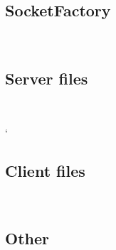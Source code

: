 \documentclass{article}
\begin{document}
\subsection{SocketFactory}~
    
    
\subsection{Server files}~
	
	`
	
\subsection{Client files}~
	
	
	
\subsection{Other}~
	
\end{document}

